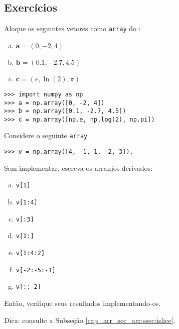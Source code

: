 \subsection{Exercícios}

\begin{exer}
  Aloque os seguintes vetores como \lstinline+array+ do {\numpy}:
  \begin{enumerate}[a)]
  \item $\displaystyle\pmb{a} = (0, -2, 4)$
  \item $\displaystyle\pmb{b} = (0.1, -2.7, 4.5)$
  \item $\displaystyle\pmb{c} = (e, \ln(2), \pi)$
  \end{enumerate}
\end{exer}
\begin{resp}
\begin{lstlisting}
>>> import numpy as np
>>> a = np.array([0, -2, 4])
>>> b = np.array([0.1, -2.7, 4.5])
>>> c = np.array([np.e, np.log(2), np.pi])
\end{lstlisting}
\end{resp}

\begin{exer}
  Considere o seguinte \lstinline+array+
\begin{lstlisting}
>>> v = np.array([4, -1, 1, -2, 3]).
\end{lstlisting}
  Sem implementar, escreva os arranjos derivados:
  \begin{enumerate}[a)]
  \item \lstinline+v[1]+
  \item \lstinline+v[1:4]+
  \item \lstinline+v[:3]+
  \item \lstinline+v[1:]+
  \item \lstinline+v[1:4:2]+
  \item \lstinline+v[-2:-5:-1]+
  \item \lstinline+v[::-2]+
  \end{enumerate}
  Então, verifique seus resultados implementando-os.
\end{exer}
\begin{resp}
  Dica: consulte a Subseção \ref{cap_arr_sec_arr:ssec:islice}. 
\end{resp}

